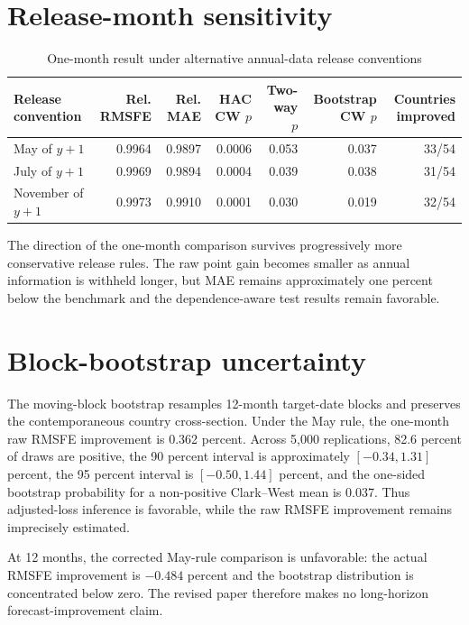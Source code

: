 \documentclass[12pt]{article}
\begin{document}
\section{Release-month sensitivity}
\begin{table}[htbp]
\centering\scriptsize
\caption{One-month result under alternative annual-data release conventions}
\begin{tabular}{lrrrrrr}
\toprule
Release convention & Rel. RMSFE & Rel. MAE & HAC CW $p$ & Two-way $p$ & Bootstrap CW $p$ & Countries improved\\
\midrule
May of $y+1$ & 0.9964 & 0.9897 & 0.0006 & 0.053 & 0.037 & 33/54\\
July of $y+1$ & 0.9969 & 0.9894 & 0.0004 & 0.039 & 0.038 & 31/54\\
November of $y+1$ & 0.9973 & 0.9910 & 0.0001 & 0.030 & 0.019 & 32/54\\
\bottomrule
\end{tabular}
\end{table}

The direction of the one-month comparison survives progressively more conservative release rules. The raw point gain becomes smaller as annual information is withheld longer, but MAE remains approximately one percent below the benchmark and the dependence-aware test results remain favorable.

\section{Block-bootstrap uncertainty}
The moving-block bootstrap resamples 12-month target-date blocks and preserves the contemporaneous country cross-section. Under the May rule, the one-month raw RMSFE improvement is 0.362 percent. Across 5,000 replications, 82.6 percent of draws are positive, the 90 percent interval is approximately $[-0.34,1.31]$ percent, the 95 percent interval is $[-0.50,1.44]$ percent, and the one-sided bootstrap probability for a non-positive Clark--West mean is 0.037. Thus adjusted-loss inference is favorable, while the raw RMSFE improvement remains imprecisely estimated.

At 12 months, the corrected May-rule comparison is unfavorable: the actual RMSFE improvement is $-0.484$ percent and the bootstrap distribution is concentrated below zero. The revised paper therefore makes no long-horizon forecast-improvement claim.
\end{document}
